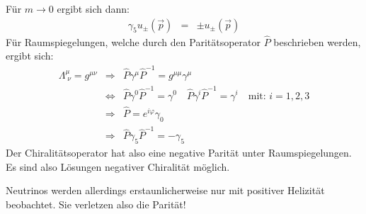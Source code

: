 Für $m\to 0$ ergibt sich dann: 
\begin{eqnarray*}
	\gamma_5 u_{\pm}(\vec{p}) &=& \pm u_{\pm}(\vec{p})
\end{eqnarray*}
Für Raumspiegelungen, welche durch den Paritätsoperator $\hat{P}$ beschrieben werden, ergibt sich: 
\begin{eqnarray*}
	\Lambda^{\mu}_{\;\nu} = g^{\mu\nu} &\Rightarrow& \hat{P}\gamma^{\mu}\hat{P}^{-1}= g^{\mu\mu}\gamma^{\mu}
	\\
	&\Leftrightarrow& \hat{P}\gamma^{0}\hat{P}^{-1} =\gamma^0 \quad \hat{P}\gamma^{i}\hat{P}^{-1}=\gamma^i \quad\text{mit: }i=1,2,3
	\\
	&\Rightarrow& \hat{P}=e^{i\varphi} \gamma_0 
	\\
	&\Rightarrow& \hat{P}\gamma_5\hat{P}^{-1}=-\gamma_5
\end{eqnarray*}
Der Chiralitätsoperator hat also eine negative Parität unter Raumspiegelungen. Es sind also Lösungen negativer Chiralität möglich. 

Neutrinos werden allerdings erstaunlicherweise nur mit positiver Helizität beobachtet. Sie verletzen also die Parität! 


